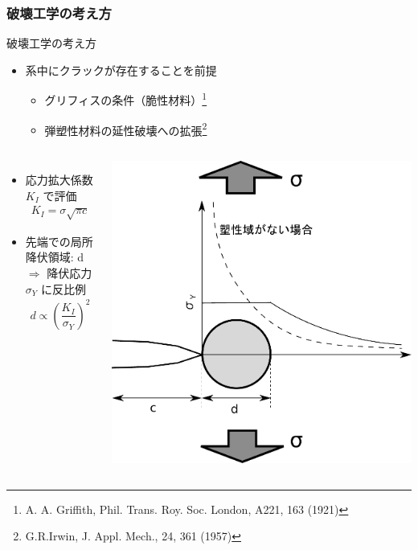 \documentclass[12pt, dvipdfmx]{beamer}
\begin{document}
\begin{frame}
    \frametitle{破壊工学の考え方}
	\vspace{-2mm}
    \begin{exampleblock}{破壊工学の考え方}
		\begin{itemize}
			\item 系中に\alert{クラックが存在することを前提}
			\begin{itemize}
				\item グリフィスの条件（脆性材料）\footnote[1]{
					A. A. Griffith, Phil. Trans. Roy. Soc. London, A221, 163 (1921)
					}
					\item 弾塑性材料の延性破壊への拡張\footnote[2]{
						G.R.Irwin, J. Appl. Mech., 24, 361 (1957)
						}
			\end{itemize}
		\end{itemize}
	\end{exampleblock}
	\vspace{-2mm}
	\begin{columns}
			\begin{itemize}
				\item
				応力拡大係数 $K_I$ で評価
				\footnotesize
				\begin{align*}
				K_{I} = \sigma \sqrt{\pi c}
				\end{align*}
				\normalsize
				\item 
				先端での局所降伏領域: d\\
				$\Rightarrow$ 降伏応力 $\sigma_Y$ に反比例
				\footnotesize
				\begin{align*}
				d \propto \left( \dfrac{K_I}{\sigma_Y} \right)^2
				\end{align*}
				\normalsize
			\end{itemize}
			\centering
			\includegraphics[width=.82\textwidth]{./Crack_Yield.pdf}
		\end{columns}
\end{frame}
\end{document}
